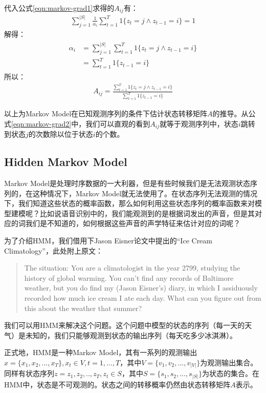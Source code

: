 代入公式\ref{eqn:markov-grad1}求得的$A_{ij}$有：
\begin{align}
  \sum_{j=1}^{|S|} \frac{1}{\alpha_i}\sum_{t=1}^{T} 1\{z_t=j \wedge z_{t-1}=i\} = 1
\end{align}
解得：
\begin{align}
\begin{split}
\alpha_i  &= \sum_{j=1}^{|S|} \sum_{t=1}^{T} 1\{z_t=j \wedge z_{t-1}=i\} \\
          &=  \sum_{t=1}^{T} 1\{z_{t-1}=i\}
\end{split}
\end{align}
所以：
\begin{align}
\label{eqn:markov-grad2}
   A_{ij} = \frac{\sum_{t=1}^{T} 1\{z_t=j \wedge z_{t-1}=i\}}{\sum_{t=1}^{T} 1\{z_{t-1}=i\}}
\end{align}

以上为Markov Model在已知观测序列的条件下估计状态转移矩阵$A$的推导。从公式\ref{eqn:markov-grad2}中，我们可以直观的看到$A_{ij}$就等于观测序列中，状态$i$跳转到状态$j$的次数除以位于状态$i$的个数。

\subsection{Hidden Markov Model}
\label{sub:hmm}
Markov Model是处理时序数据的一大利器，但是有些时候我们是无法观测状态序列的，在这种情况下，Markov Model就无法使用了。在状态序列无法观测的情况下，我们知道这些状态的概率函数，那么如何利用这些状态序列的概率函数来对模型建模呢？比如说语音识别中的，我们能观测到的是根据词发出的声音，但是其对应的词我们是不知道的，如何根据这些声音的声学特征来估计对应的词呢？

为了介绍HMM，我们借用下Jason Eisner论文中提出的“Ice Cream Climatology”，此处附上原文：

\begin{quotation}
The situation: You are a climatologist in the year 2799, studying the history of global warming. You can't find any records of Baltimore weather, but you do find my (Jason Eisner's) diary, in which I assiduously recorded how much ice cream I ate each day. What can you figure out from this about the weather that summer?
\end{quotation}

我们可以用HMM来解决这个问题。这个问题中模型的状态的序列（每一天的天气）是未知的，我们只能够观测到状态的输出序列（每天吃多少冰淇淋）。

正式地，HMM是一种Markov Model，其有一系列的观测输出$x=\{x_1, x_2, ..., x_T\}, x_t\in{V}, t=1,...,T$，其中$V=\{v_1, v_2, ..., v_{|V|}\}$为观测输出集合。同样有状态序列$z={z_1, z_2, .., z_T}, z_{t}\in{S}$，其中$S=\{s_1, s_2, ..., s_{|S|}\}$为状态的集合。在HMM中，状态是不可观测的。状态之间的转移概率仍然由状态转移矩阵$A$表示。

